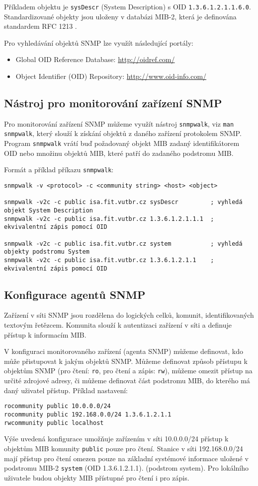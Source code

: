 Příkladem objektu je {\tt sysDescr} (System Description) s OID {\tt 1.3.6.1.2.1.1.6.0}. Standardizované objekty jsou uloženy v databázi MIB-2, která je definována standardem RFC 1213 \cite{rfc1213}.

Pro vyhledávání objektů SNMP lze využít následující portály:
\begin{itemize}
  \item Global OID Reference Database: \url{http://oidref.com/}
  \item Object Identifier (OID) Repository: \url{http://www.oid-info.com/}
\end{itemize}

\subsection{Nástroj pro monitorování zařízení SNMP}
Pro monitorování zařízení SNMP můžeme využít nástroj {\tt snmpwalk}, viz {\tt man snmpwalk}, který slouží k získání objektů z daného zařízení protokolem SNMP. Program {\tt snmpwalk} vrátí buď požadovaný objekt MIB zadaný identifikátorem OID nebo množinu objektů MIB, které patří do zadaného podstromu MIB.

Formát a příklad příkazu {\tt snmpwalk}:
{\small
\begin{verbatim}
snmpwalk -v <protocol> -c <community string> <host> <object>

snmpwalk -v2c -c public isa.fit.vutbr.cz sysDescr         ; vyhledá objekt System Description
snmpwalk -v2c -c public isa.fit.vutbr.cz 1.3.6.1.2.1.1.1  ; ekvivalentní zápis pomocí OID

snmpwalk -v2c -c public isa.fit.vutbr.cz system           ; vyhledá objekty podstromu System
snmpwalk -v2c -c public isa.fit.vutbr.cz 1.3.6.1.2.1.1    ; ekvivalentní zápis pomocí OID
\end{verbatim}
}

\subsection{Konfigurace agentů SNMP}
Zařízení v síti SNMP jsou rozdělena do logických celků, komunit, identifikovaných textovým  řetězcem. Komunita slouží k autentizaci zařízení v síti a definuje přístup k informacím MIB.

V konfiguraci monitorovaného zařízení (agenta SNMP) můžeme definovat, kdo může přistupovat k jakým objektů SNMP. Můžeme definovat způsob přístupu k objektům SNMP (pro čtení: {\tt ro},  pro čtení a zápis: {\tt rw}), můžeme omezit přístup na určité zdrojové adresy, či můžeme definovat část podstromu MIB, do kterého má daný uživatel přístup.  
Příklad nastavení: 
\begin{verbatim}
rocommunity public 10.0.0.0/24
rocommunity public 192.168.0.0/24 1.3.6.1.2.1.1
rwcommunity public localhost
\end{verbatim}
Výše uvedená konfigurace umožňuje zařízením v síti 10.0.0.0/24 přístup k objektům MIB komunity {\tt public} pouze
 pro čtení. Stanice v síti 192.168.0.0/24 mají přístup pro čtení omezen pouze na základní systémové informace uložené v podstromu MIB-2 {\tt system} (OID 1.3.6.1.2.1.1). 
 (podstrom system). Pro lokálního uživatele budou objekty MIB přístupné pro čtení i pro zápis.

